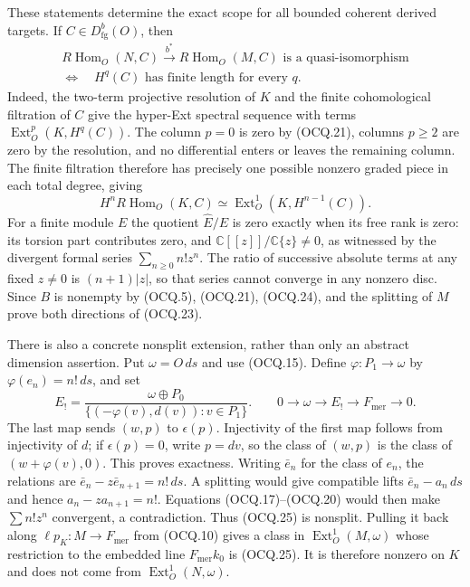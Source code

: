 These statements determine the exact scope for all bounded coherent
derived targets.  If $C\in D^b_{\mathrm{fg}}(O)$, then
\[
 \begin{gathered}
 R\operatorname{Hom}_O(N,C)\xrightarrow{\ b^*\ }
 R\operatorname{Hom}_O(M,C)\text{ is a quasi-isomorphism}\\
 \Longleftrightarrow\quad
 H^q(C)\text{ has finite length for every }q.
 \end{gathered}                                               \tag{OCQ.23}
\]
Indeed, the two-term projective resolution of $K$ and the finite
cohomological filtration of $C$ give the hyper-Ext spectral sequence
with terms $\operatorname{Ext}^p_O(K,H^q(C))$.
The column $p=0$ is zero by (OCQ.21), columns $p\ge2$ are zero by
the resolution, and no differential enters or leaves the remaining
column.  The finite filtration therefore has precisely one possible
nonzero graded piece in each total degree, giving
\[
 H^nR\operatorname{Hom}_O(K,C)
   \simeq\operatorname{Ext}^1_O(K,H^{n-1}(C)).                 \tag{OCQ.24}
\]
For a finite module $E$ the quotient $\widehat E/E$ is zero exactly
when its free rank is zero: its torsion part contributes zero, and
$\mathbb C[[z]]/\mathbb C\{z\}\ne0$, as witnessed by the divergent
formal series $\sum_{n\ge0}n!z^n$.  The ratio of successive absolute
terms at any fixed $z\ne0$ is $(n+1)|z|$, so that series cannot
converge in any nonzero disc.  Since $B$ is nonempty by (OCQ.5),
(OCQ.21), (OCQ.24), and the splitting of $M$ prove both directions
of (OCQ.23).

There is also a concrete nonsplit extension, rather than only an abstract
dimension assertion.  Put $\omega=O\,ds$ and use (OCQ.15).  Define
$\varphi:P_1\to\omega$ by $\varphi(e_n)=n!\,ds$, and set
\[
 E_!=\frac{\omega\oplus P_0}
              {\{(-\varphi(v),d(v)):v\in P_1\}}.
 \qquad
 0\longrightarrow\omega\longrightarrow E_!
       \longrightarrow F_{\mathrm{mer}}\longrightarrow0.      \tag{OCQ.25}
\]
The last map sends $(w,p)$ to $\epsilon(p)$.
Injectivity of the first map follows from injectivity of $d$;
if $\epsilon(p)=0$, write $p=dv$, so the class of $(w,p)$ is the
class of $(w+\varphi(v),0)$.  This proves exactness.
Writing $\bar e_n$ for the class of $e_n$, the relations are
$\bar e_n-z\bar e_{n+1}=n!\,ds$.
A splitting would give compatible lifts
$\bar e_n-a_n\,ds$ and hence
$a_n-za_{n+1}=n!$.  Equations (OCQ.17)--(OCQ.20) would then make
$\sum n!z^n$ convergent, a contradiction.  Thus (OCQ.25) is nonsplit.
Pulling it back along $\ell p_K:M\to F_{\mathrm{mer}}$ from
(OCQ.10) gives a class in $\operatorname{Ext}^1_O(M,\omega)$ whose
restriction to the embedded line $F_{\mathrm{mer}}k_0$ is (OCQ.25).
It is therefore nonzero on $K$ and does not come from
$\operatorname{Ext}^1_O(N,\omega)$.

